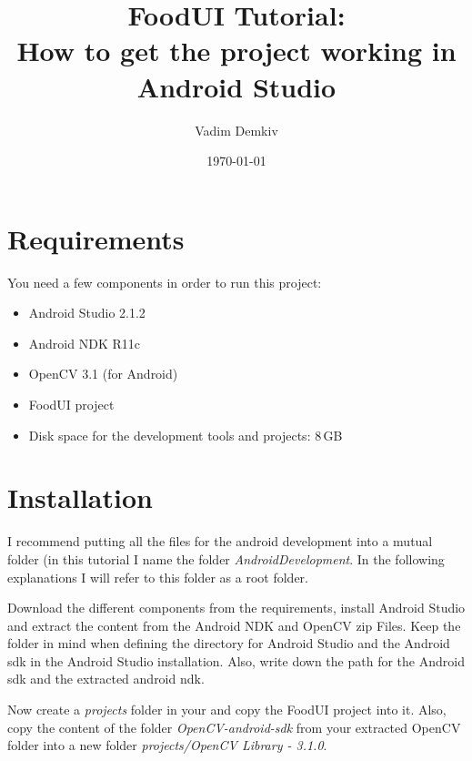 \documentclass[abstract=on, 12pt, a4paper]{scrartcl}
\title{FoodUI Tutorial:\\How to get the project working in Android Studio}
\author{Vadim Demkiv}
\date{\today}
\begin{document}
\maketitle




\section{Requirements}
You need a few components in order to run this project:

\begin{itemize}
	\item Android Studio 2.1.2
	\item Android NDK R11c
	\item OpenCV 3.1 (for Android)
	\item FoodUI project
	\item Disk space for the development tools and projects: 8\,GB
\end{itemize}


\section{Installation}
I recommend putting all the files for the android development into a mutual folder (in this tutorial I name the folder \textit{AndroidDevelopment}. In the following explanations I will refer to this folder as a root folder. 

Download the different components from the requirements, install Android Studio and extract the content from the Android NDK and OpenCV zip Files.
Keep the folder  in mind when defining the directory for Android Studio and the Android sdk in the Android Studio installation.
Also, write down the path for the Android sdk and the extracted android ndk.

Now create a \textit{projects} folder in your  and copy the FoodUI project into it. Also, copy the content of the folder \textit{OpenCV-android-sdk\sdk\java} from your extracted OpenCV folder into a new folder \textit{projects/OpenCV Library - 3.1.0}.
\end{document}
